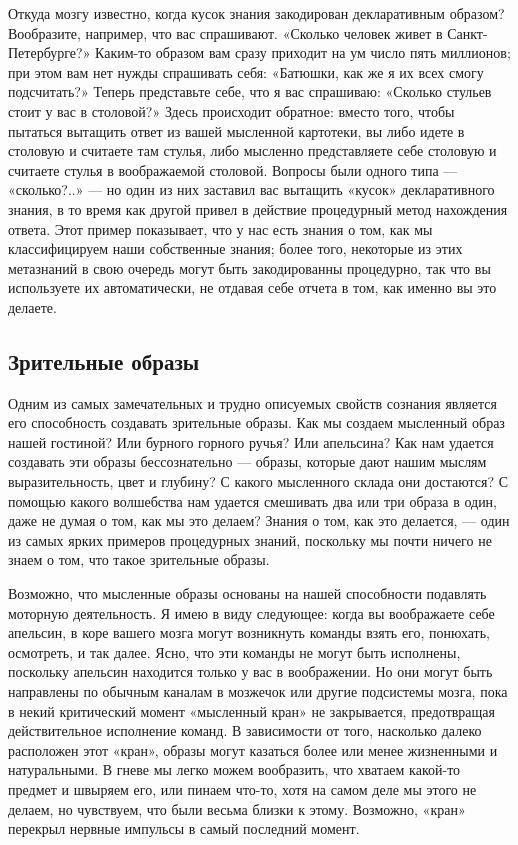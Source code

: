 \documentclass[../main.tex]{subfiles}
\begin{document}
Откуда мозгу известно, когда кусок знания закодирован декларативным образом? Вообразите, например, что вас спрашивают. «Сколько человек живет в Санкт-Петербурге?» Каким-то образом вам сразу приходит на ум число пять миллионов; при этом вам нет нужды спрашивать себя: «Батюшки, как же я их всех смогу подсчитать?» Теперь представьте себе, что я вас спрашиваю: «Сколько стульев стоит у вас в столовой?» Здесь происходит обратное: вместо того, чтобы пытаться вытащить ответ из вашей мысленной картотеки, вы либо идете в столовую и считаете там стулья, либо мысленно представляете себе столовую и считаете стулья в воображаемой столовой. Вопросы были одного типа --- «сколько?..» --- но один из них заставил вас вытащить «кусок» декларативного знания, в то время как другой привел в действие процедурный метод нахождения ответа. Этот пример показывает, что у нас есть знания о том, как мы классифицируем наши собственные знания; более того, некоторые из этих метазнаний в свою очередь могут быть закодированны процедурно, так что вы используете их автоматически, не отдавая себе отчета в том, как именно вы это делаете.

\subsection{Зрительные образы}

Одним из самых замечательных и трудно описуемых свойств сознания является его способность создавать зрительные образы. Как мы создаем мысленный образ нашей гостиной? Или бурного горного ручья? Или апельсина? Как нам удается создавать эти образы бессознательно --- образы, которые дают нашим мыслям выразительность, цвет и глубину? С какого мысленного склада они достаются? С помощью какого волшебства нам удается смешивать два или три образа в один, даже не думая о том, как мы это делаем? Знания о том, как это делается, --- один из самых ярких примеров процедурных знаний, поскольку мы почти ничего не знаем о том, что такое зрительные образы.

Возможно, что мысленные образы основаны на нашей способности подавлять моторную деятельность. Я имею в виду следующее: когда вы воображаете себе апельсин, в коре вашего мозга могут возникнуть команды взять его, понюхать, осмотреть, и так далее. Ясно, что эти команды не могут быть исполнены, поскольку апельсин находится только у вас в воображении. Но они могут быть направлены по обычным каналам в мозжечок или другие подсистемы мозга, пока в некий критический момент «мысленный кран» не закрывается, предотвращая действительное исполнение команд. В зависимости от того, насколько далеко расположен этот «кран», образы могут казаться более или менее жизненными и натуральными. В гневе мы легко можем вообразить, что хватаем какой-то предмет и швыряем его, или пинаем что-то, хотя на самом деле мы этого не делаем, но чувствуем, что были весьма близки к этому. Возможно, «кран» перекрыл нервные импульсы в самый последний момент.
\end{document}
